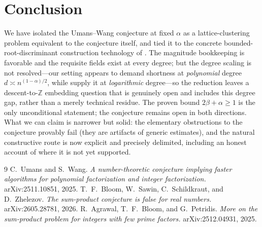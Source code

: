\documentclass[11pt]{article}
\theoremstyle{definition}
\newcommand{\Z}{\mathbb{Z}}
\begin{document}
\section{Conclusion}

We have isolated the Umans--Wang conjecture at fixed $\alpha$ as a lattice-clustering
problem equivalent to the conjecture itself, and tied it to the concrete
bounded-root-discriminant construction technology of \cite{BSSZ}. The magnitude
bookkeeping is favorable and the requisite fields exist at every degree; but the
degree scaling is not resolved---our setting appears to demand shortness at
\emph{polynomial} degree $d\asymp n^{(1-\alpha)/2}$, while \cite{BSSZ} supply it at
\emph{logarithmic} degree---so the reduction leaves a descent-to-$\Z$ embedding
question that is genuinely open and includes this degree gap, rather than a merely
technical residue. The proven bound $2\beta+\alpha\ge 1$ is the only unconditional
statement; the conjecture remains open in both directions. What we can claim is
narrower but solid: the elementary obstructions to the conjecture provably fail
(they are artifacts of generic estimates), and the natural constructive route is now
explicit and precisely delimited, including an honest account of where it is not yet
supported.

\begin{thebibliography}{9}
 C.~Umans and S.~Wang. \emph{A number-theoretic conjecture implying
faster algorithms for polynomial factorization and integer factorization.}
arXiv:2511.10851, 2025.
 T.~F.~Bloom, W.~Sawin, C.~Schildkraut, and D.~Zhelezov.
\emph{The sum-product conjecture is false for real numbers.} arXiv:2605.28781, 2026.
 R.~Agrawal, T.~F.~Bloom, and G.~Petridis. \emph{More on the
sum-product problem for integers with few prime factors.} arXiv:2512.04931, 2025.
\end{thebibliography}
\end{document}
